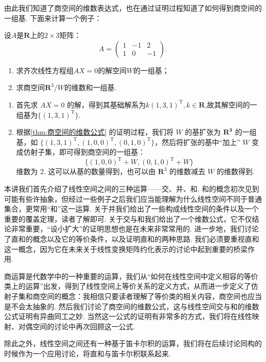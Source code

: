 由此我们知道了商空间的维数表达式，也在通过证明过程知道了如何得到商空间的一组基. 下面来计算一个例子：

\begin{example}{}{}
    设$A$是$\mathbf{R}$上的$2\times 3$矩阵：
    \[A=\begin{pmatrix}
            1 & -1 & 2 \\ 1 & 0 & -1
        \end{pmatrix}.\]
    \begin{enumerate}
        \item 求齐次线性方程组$AX=0$的解空间$W$的一组基；

        \item 求商空间$\mathbf{R}^3/W$的维数和一组基.
    \end{enumerate}
\end{example}

\begin{solution}
    \begin{enumerate}
        \item 首先求 $AX=0$ 的解，得到其基础解系为$k(1,3,1)^{\mathrm{T}},k \in \mathbf{R}$,故其解空间的一组基为$\{(1,3,1)^{\mathrm{T}}\}$.
        \item 根据\autoref{thm:商空间的维数公式} 的证明过程，我们将 $W$ 的基扩张为 $\mathbf{R^3}$ 的一组基，如 $\{(1,3,1)^{\mathrm{T}},(1,0,0)^{\mathrm{T}},(0,1,0)^{\mathrm{T}}\}$，然后将扩张的基中``加上'' $W$ 变成仿射子集，即可得到商空间的一组基：
        \[
            \{(1,0,0)^{\mathrm{T}}+W,(0,1,0)^{\mathrm{T}}+W\}
        \]
        维数为 $2$. 这可以从基的数量得到，也可以由 $\mathbf{R}^3$ 的维数减去 $W$ 的维数得到.

    \end{enumerate}
\end{solution}

\begin{summary}

    本讲我们首先介绍了线性空间之间的三种运算——交、并、和. 和的概念初次见到可能有些许抽象，但经过一些例子之后我们应当能理解为什么线性空间不同于普通集合，更常用``和''这一运算. 关于并我们给出了一些构成线性空间的条件以及一个重要的覆盖定理，读者了解即可. 关于交与和我们给出了一个维数公式，它不仅结论非常重要，``设小扩大''的证明思想也是在未来非常常用的. 进一步地，我们讨论了直和的概念以及它的等价条件，以及证明直和的两种思路. 我们必须要重视直和这一概念，因为它在未来关于线性变换矩阵约化表示的讨论中起到重要的桥梁作用.

    商运算是代数学中的一种重要的运算，我们从``如何在线性空间中定义相容的等价类上的运算''出发，得到了线性空间上等价关系的定义方式，从而进一步定义了仿射子集和商空间的概念：我相信只要读者理解了等价类的相关内容，商空间也应当是不会太抽象的. 然后我们讨论了商空间的维数公式，这与线性空间交与和的维数公式证明有异曲同工之妙. 当然这一公式的证明有非常多的方式，我们将在线性映射、对偶空间的讨论中再次回顾这一公式.

    除此之外，线性空间之间还有一种基于笛卡尔积的运算，我们将在后续讨论同构的时候作为一个应用讨论，将直和与笛卡尔积联系起来.

\end{summary}

